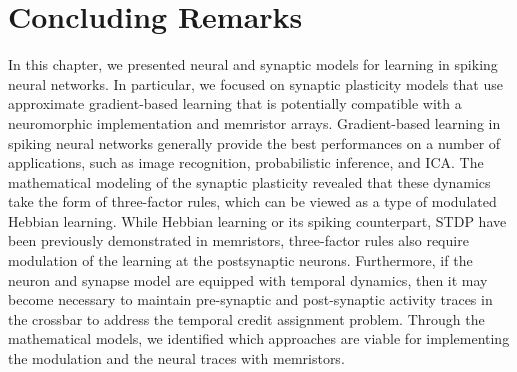 \documentclass[english]{article}
\renewcommand{\refeq}[1]{{Eq.~(\ref{#1})}}
\newcommand{\refsec}[1]{{Sec.~\ref{#1}}}
\begin{document}
\section{Concluding Remarks}
In this chapter, we presented neural and synaptic models for learning in spiking neural networks. In particular, we focused on synaptic plasticity models that use approximate gradient-based learning that is potentially compatible with a neuromorphic implementation and memristor arrays. 
Gradient-based learning in spiking neural networks generally provide the best performances on a number of applications, such as image recognition, probabilistic inference, and ICA. The mathematical modeling of the synaptic plasticity revealed that these dynamics take the form of three-factor rules, which can be viewed as a type of modulated Hebbian learning. While Hebbian learning or its spiking counterpart, \ac{STDP} have been previously demonstrated in memristors, three-factor rules also require modulation of the learning at the postsynaptic neurons. Furthermore, if the neuron and synapse model are equipped with temporal dynamics, then it may become necessary to maintain pre-synaptic and post-synaptic activity traces in the crossbar to address the temporal credit assignment problem. Through the mathematical models, we identified which approaches are viable for implementing the modulation and the neural traces with memristors.


\end{document}
